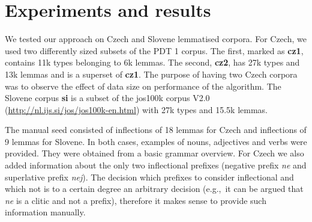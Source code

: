 \documentclass{itatnew}
\newcommand{\e}[1]{\textit{#1}} %
\newcommand{\eg}{e.g.,~}
\begin{document}
%
%

\section{Experiments and results}

We tested our approach on Czech and Slovene lemmatised corpora. For Czech, we used two differently sized subsets of the PDT 1 corpus. The first, marked as \textbf{cz1}, contains 11k types belonging to 6k lemmas. The second, \textbf{cz2}, has 27k types and 13k lemmas and is a superset of \textbf{cz1}. The purpose of having two Czech corpora was to observe the effect of data size on performance of the algorithm. The Slovene corpus \textbf{si} is a subset of the jos100k corpus V2.0 (\url{http://nl.ijs.si/jos/jos100k-en.html}) with 27k types and 15.5k lemmas.

The manual seed consisted of inflections of 18 lemmas for Czech and inflections of 9 lemmas for Slovene.  In both cases, examples of nouns, adjectives and verbs were provided. They were obtained from a basic grammar overview. For Czech we also added information about the only two inflectional prefixes (negative prefix \e{ne} and superlative prefix \e{nej}). The decision which prefixes to consider inflectional and which not is to a certain degree an arbitrary decision (\eg it can be argued that \e{ne} is a clitic and not a prefix), therefore it makes sense to provide such information manually.
\end{document}
